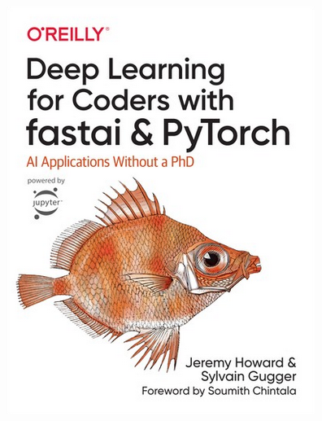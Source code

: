 \documentclass[12pt]{article} 	%
\begin{document}
\begin{figure}[h!]
	\begin{center}
		\includegraphics[scale=1.3]{img/fastbook.png}
	\end{center}
  \caption{\cite{howard2020deep}}  %
  \label{fig:fastbook}
\end{figure}


\newpage

\end{document}
